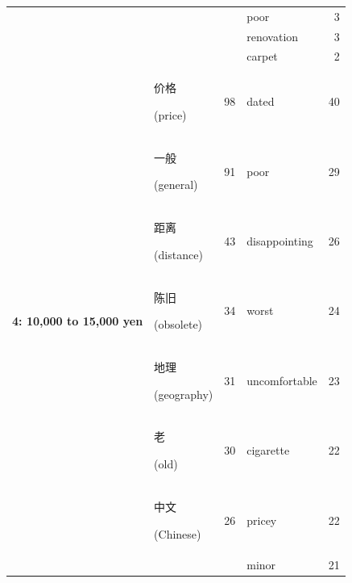 \documentclass[smallextended,natbib]{svjour3}       %
\begin{document}
\begin{table}[ht]
{\begin{tabular}{|c|lr|lr|}
                                                             &                                                &      & poor           & 3   \\  
                                                             &                                                &      & renovation     & 3   \\  
                                                             &                                                &      & carpet         & 2   \\ \hline
        \multirow{10}{*}{\textbf{4: 10,000 to 15,000 yen}}   & \begin{CJK}{UTF8}{gbsn}价格\end{CJK} (price)     & 98   & dated          & 40  \\  
                                                             & \begin{CJK}{UTF8}{gbsn}一般\end{CJK} (general)   & 91   & poor           & 29  \\  
                                                             & \begin{CJK}{UTF8}{gbsn}距离\end{CJK} (distance)  & 43   & disappointing  & 26  \\  
                                                             & \begin{CJK}{UTF8}{gbsn}陈旧\end{CJK} (obsolete)  & 34   & worst          & 24  \\  
                                                             & \begin{CJK}{UTF8}{gbsn}地理\end{CJK} (geography) & 31   & uncomfortable  & 23  \\  
                                                             & \begin{CJK}{UTF8}{gbsn}老\end{CJK} (old)        & 30   & cigarette      & 22  \\  
                                                             & \begin{CJK}{UTF8}{gbsn}中文\end{CJK} (Chinese)   & 26   & pricey         & 22  \\  
                                                             &                                                &      & minor          & 21  \\  

\end{tabular}}
\end{table}
\end{document}
